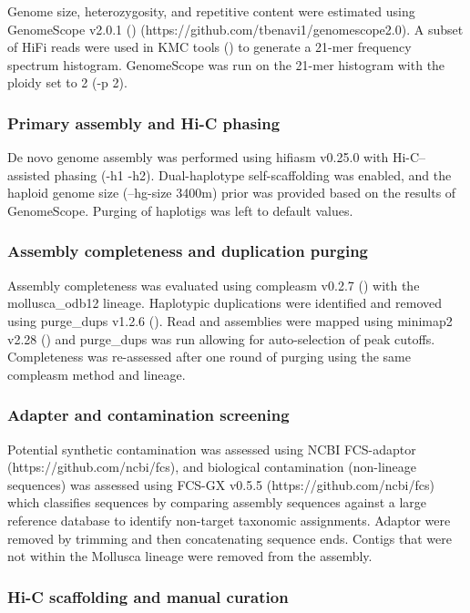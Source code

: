 \documentclass[11pt]{article}
\begin{document}
Genome size, heterozygosity, and repetitive content were estimated using GenomeScope v2.0.1 (\cite{Vurture2017}) (https://github.com/tbenavi1/genomescope2.0). A subset of HiFi reads were used in KMC tools (\cite{Kokot2017}) to generate a 21-mer frequency spectrum histogram. GenomeScope was run on the 21-mer histogram with the ploidy set to 2 (-p 2).

\subsubsection{Primary assembly and Hi-C phasing}

De novo genome assembly was performed using hifiasm v0.25.0 \cite{Cheng2021} with Hi-C–assisted phasing (-h1 -h2). Dual-haplotype self-scaffolding was enabled, and the haploid genome size (--hg-size 3400m) prior was provided based on the results of GenomeScope. Purging of haplotigs was left to default values.

\subsubsection{Assembly completeness and duplication purging}

Assembly completeness was evaluated using compleasm v0.2.7 (\cite{Huang2023Compleasm}) with the mollusca\_odb12 lineage. Haplotypic duplications were identified and removed using purge\_dups v1.2.6 (\cite{Guan2020}). Read and assemblies were mapped using minimap2 v2.28 (\cite{Li2018}) and purge\_dups was run allowing for auto-selection of peak cutoffs. Completeness was re-assessed after one round of purging using the same compleasm method and lineage.

\subsubsection{Adapter and contamination screening}

Potential synthetic contamination was assessed using NCBI FCS-adaptor (https://github.com/ncbi/fcs), and biological contamination (non-lineage sequences) was assessed using FCS-GX v0.5.5 (https://github.com/ncbi/fcs) which classifies sequences by comparing assembly sequences against a large reference database to identify non-target taxonomic assignments. Adaptor were removed by trimming and then concatenating sequence ends. Contigs that were not within the Mollusca lineage were removed from the assembly.

\subsubsection{Hi-C scaffolding and manual curation}
\end{document}
